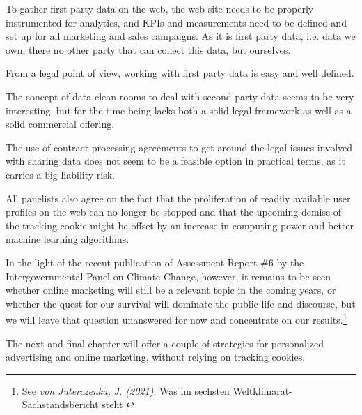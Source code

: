 To gather first party data on the web, the web site needs to be properly instrumented for analytics, and KPIs and measurements need to be defined and set up for all marketing and sales campaigns. As it is first party data, i.e. data we own, there no other party that can collect this data, but ourselves.

From a legal point of view, working with first party data is easy and well defined.

The concept of data clean rooms to deal with second party data seems to be very interesting, but for the time being lacks both a solid legal framework as well as a solid commercial offering.

The use of contract processing agreements to get around the legal issues involved with sharing data does not seem to be a feasible option in practical terms, as it carries a big liability risk.

All panelists also agree on the fact that the proliferation of readily available user profiles on the web can no longer be stopped and that the upcoming demise of the tracking cookie might be offset by an increase in computing power and better machine learning algorithms.

In the light of the recent publication of Assessment Report \#6 by the Intergovernmental Panel on Climate Change, however, it remains to be seen whether online marketing will still be a relevant topic in the coming years, or whether the quest for our survival will dominate the public life and discourse, but we will leave that question unanswered for now and concentrate on our results.\footnote{See \textit{von Juterczenka, J. (2021)}: Was im sechsten Weltklimarat-Sachstandsbericht steht \cite{ipccAr6}}

The next and final chapter will offer a couple of strategies for personalized advertising and online marketing, without relying on tracking cookies.
